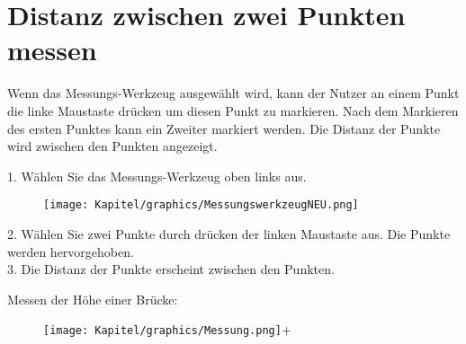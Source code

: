 \chapter{Distanz zwischen zwei Punkten messen}
Wenn das Messungs-Werkzeug ausgewählt wird, kann der Nutzer an einem Punkt die linke Maustaste drücken um diesen Punkt zu markieren. Nach dem Markieren des ersten Punktes kann ein Zweiter markiert werden. Die Distanz der Punkte wird zwischen den Punkten angezeigt.

1. Wählen Sie das Messungs-Werkzeug oben links aus.

\begin{figure}[th]
    \centering
    \texttt{[image: Kapitel/graphics/MessungswerkzeugNEU.png]}
    \label{fig:enter-label}
\end{figure}

2. Wählen Sie zwei Punkte durch drücken der linken Maustaste aus. 
Die Punkte werden hervorgehoben.\\
3. Die Distanz der Punkte erscheint zwischen den Punkten.

\newpage
Messen der Höhe einer Brücke:
\begin{figure}[th]
    \centering
    \texttt{[image: Kapitel/graphics/Messung.png]}+
    \label{fig:enter-label}
\end{figure}